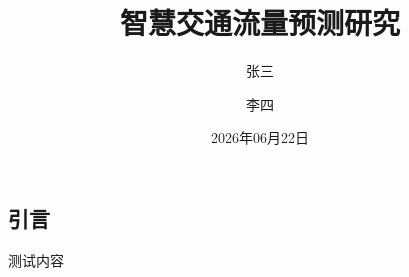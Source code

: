 \documentclass[twocolumn]{harryopo-paper}
\title{智慧交通流量预测研究}
\author{张三 \and 李四}
\date{2026年06月22日}
\begin{document}
\maketitlewithabstract
\subsection{引言}
测试内容
\end{document}
